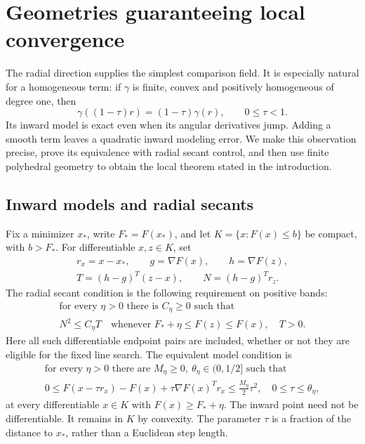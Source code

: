 \section{Geometries guaranteeing local convergence}\label{art:positive}

The radial direction supplies the simplest comparison field. It is especially
natural for a homogeneous term: if $\gamma$ is finite, convex and positively
homogeneous of degree one, then
\[
 \gamma((1-\tau)r)=(1-\tau)\gamma(r),\qquad 0\le\tau<1.
\]
Its inward model is exact even when its angular derivatives jump. Adding a
smooth term leaves a quadratic inward modeling error. We make this observation
precise, prove its equivalence with radial secant control, and then use finite
polyhedral geometry to obtain the local theorem stated in the introduction.

\subsection{Inward models and radial secants}

Fix a minimizer $x_*$, write $F_*=F(x_*)$, and let
$K=\{x:F(x)\le b\}$ be compact, with $b>F_*$. For differentiable $x,z\in K$,
set
\[
 \begin{gathered}
 r_x=x-x_*,\qquad g=\nabla F(x),\qquad h=\nabla F(z),\\
 T=(h-g)^T(z-x),\qquad N=(h-g)^Tr_z.
 \end{gathered}
\]
The radial secant condition is the following requirement on positive bands:
\begin{equation}\label{art:radial-condition}
 \begin{gathered}
 \text{for every }\eta>0\text{ there is }C_\eta\ge0\text{ such that}\\
 N^2\le C_\eta T
 \quad\text{whenever }F_*+\eta\le F(z)\le F(x),\quad T>0.
 \end{gathered}
\end{equation}
Here all such differentiable endpoint pairs are included, whether or not they
are eligible for the fixed line search. The equivalent model condition is
\begin{equation}\label{art:inward-condition}
 \begin{gathered}
 \text{for every }\eta>0\text{ there are }M_\eta\ge0,
       \ \theta_\eta\in(0,1/2]\text{ such that}\\
 0\le F(x-\tau r_x)-F(x)+\tau\nabla F(x)^Tr_x
       \le\frac{M_\eta}{2}\tau^2,\quad 0\le\tau\le\theta_\eta,
 \end{gathered}
\end{equation}
at every differentiable $x\in K$ with $F(x)\ge F_*+\eta$.
The inward point need not be differentiable. It remains in $K$ by convexity.
The parameter $\tau$ is a fraction of the distance to $x_*$, rather than a
Euclidean step length.


